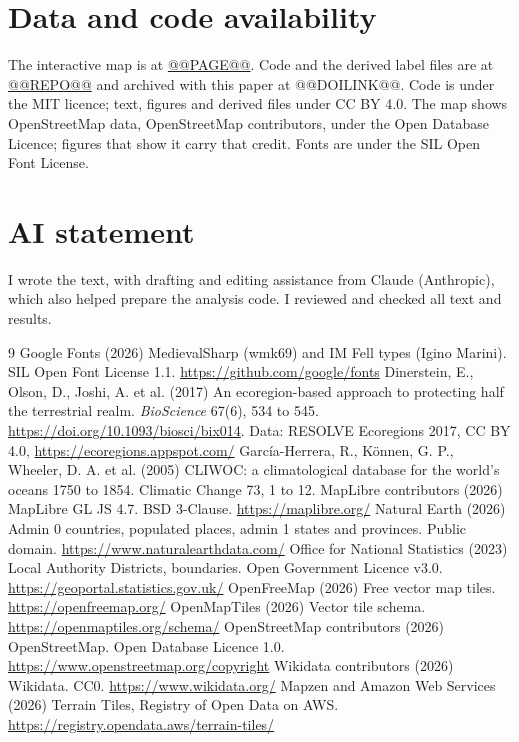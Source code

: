 \documentclass[11pt,a4paper]{article}
\begin{document}
\section*{Data and code availability}
The interactive map is at \url{@@PAGE@@}. Code and the derived label files are at \url{@@REPO@@} and archived with this paper at @@DOILINK@@. Code is under the MIT licence; text, figures and derived files under CC BY 4.0. The map shows OpenStreetMap data, \textcopyright{} OpenStreetMap contributors, under the Open Database Licence; figures that show it carry that credit. Fonts are under the SIL Open Font License.

\section*{AI statement}
I wrote the text, with drafting and editing assistance from Claude (Anthropic), which also helped prepare the analysis code. I reviewed and checked all text and results.

\begin{thebibliography}{9}
 Google Fonts (2026) MedievalSharp (wmk69) and IM Fell types (Igino Marini). SIL Open Font License 1.1. \url{https://github.com/google/fonts}
 Dinerstein, E., Olson, D., Joshi, A. et al. (2017) An ecoregion-based approach to protecting half the terrestrial realm. \emph{BioScience} 67(6), 534 to 545. \url{https://doi.org/10.1093/biosci/bix014}. Data: RESOLVE Ecoregions 2017, CC BY 4.0, \url{https://ecoregions.appspot.com/}
 Garc\'ia-Herrera, R., K\"onnen, G. P., Wheeler, D. A. et al. (2005) CLIWOC: a climatological database for the world's oceans 1750 to 1854. Climatic Change 73, 1 to 12.
 MapLibre contributors (2026) MapLibre GL JS 4.7. BSD 3-Clause. \url{https://maplibre.org/}
 Natural Earth (2026) Admin 0 countries, populated places, admin 1 states and provinces. Public domain. \url{https://www.naturalearthdata.com/}
 Office for National Statistics (2023) Local Authority Districts, boundaries. Open Government Licence v3.0. \url{https://geoportal.statistics.gov.uk/}
 OpenFreeMap (2026) Free vector map tiles. \url{https://openfreemap.org/}
 OpenMapTiles (2026) Vector tile schema. \url{https://openmaptiles.org/schema/}
 OpenStreetMap contributors (2026) OpenStreetMap. Open Database Licence 1.0. \url{https://www.openstreetmap.org/copyright}
 Wikidata contributors (2026) Wikidata. CC0. \url{https://www.wikidata.org/}
 Mapzen and Amazon Web Services (2026) Terrain Tiles, Registry of Open Data on AWS. \url{https://registry.opendata.aws/terrain-tiles/}
\end{thebibliography}
\end{document}
